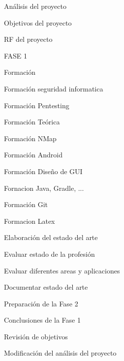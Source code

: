 \begin{numbered}
	\setcounter{numberedi}{-1} %
	
	\item Análisis del proyecto
	\begin{numbered}
		\item Objetivos del proyecto
		\item RF del proyecto
	\end{numbered}
	
	\item FASE 1
	\begin{numbered}
		
		\item Formación
		\begin{numbered}
			\item Formación seguridad informatica
			\item Formación Pentesting
			\begin{numbered}
				\item Formación Teórica
				\item Formación NMap
			\end{numbered}
			\item Formación Android
			\begin{numbered}
				\item Formación Diseño de GUI
				\item Fornacion Java, Gradle, ...
			\end{numbered}
			\item Formación Git
			\item Formacion Latex
		\end{numbered}
		
		\item Elaboración del estado del arte
		\begin{numbered}
			\item Evaluar estado de la profesión
			\item Evaluar diferentes areas y aplicaciones
			\item Documentar estado del arte
		\end{numbered}
		
		\item Preparación de la Fase 2
		\begin{numbered}
			\item Conclusiones de la Fase 1
			\item Revisión de objetivos
			\item Modificación del análisis del proyecto
		\end{numbered}
	\end{numbered}
	

\end{numbered}
